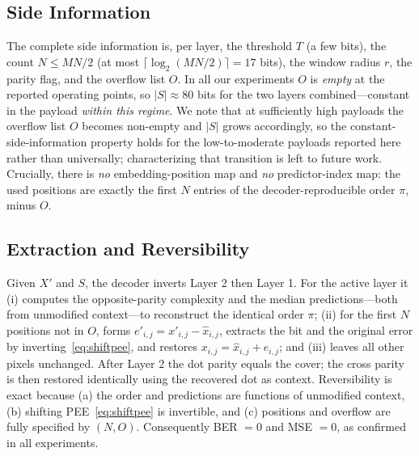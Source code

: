 \documentclass[journal,article,submit,pdftex,moreauthors]{Definitions/mdpi}
\begin{document}
\subsection{Side Information}\label{sec:sideinfo}
The complete side information is, per layer, the threshold $T$ (a few bits), the count $N\le MN/2$ (at most $\lceil\log_2(MN/2)\rceil=17$ bits), the window radius $r$, the parity flag, and the overflow list $O$. In all our experiments $O$ is \emph{empty} at the reported operating points, so $|S|\approx 80$ bits for the two layers combined---constant in the payload \emph{within this regime}. We note that at sufficiently high payloads the overflow list $O$ becomes non-empty and $|S|$ grows accordingly, so the constant-side-information property holds for the low-to-moderate payloads reported here rather than universally; characterizing that transition is left to future work. Crucially, there is \emph{no} embedding-position map and \emph{no} predictor-index map: the used positions are exactly the first $N$ entries of the decoder-reproducible order $\pi$, minus $O$.

\subsection{Extraction and Reversibility}\label{sec:extract}
Given $X'$ and $S$, the decoder inverts Layer 2 then Layer 1. For the active layer it (i) computes the opposite-parity complexity and the median predictions---both from unmodified context---to reconstruct the identical order $\pi$; (ii) for the first $N$ positions not in $O$, forms $e'_{i,j}=x'_{i,j}-\hat{x}_{i,j}$, extracts the bit and the original error by inverting~\eqref{eq:shiftpee}, and restores $x_{i,j}=\hat{x}_{i,j}+e_{i,j}$; and (iii) leaves all other pixels unchanged. After Layer 2 the dot parity equals the cover; the cross parity is then restored identically using the recovered dot as context. Reversibility is exact because (a) the order and predictions are functions of unmodified context, (b) shifting PEE~\eqref{eq:shiftpee} is invertible, and (c) positions and overflow are fully specified by $(N,O)$. Consequently BER $=0$ and MSE $=0$, as confirmed in all experiments.
\end{document}
